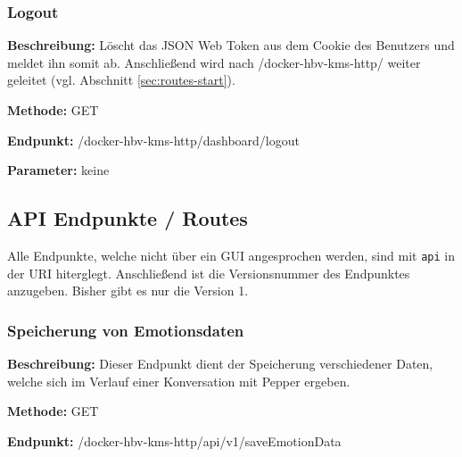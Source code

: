 \subsubsection{Logout}
\label{sec:routes-logout}
\textbf{Beschreibung:} Löscht das JSON Web Token aus dem Cookie des Benutzers und meldet ihn somit ab. Anschließend wird nach /docker-hbv-kms-http/ weiter geleitet (vgl. Abschnitt \ref{sec:routes-start}).

\textbf{Methode:} GET

\textbf{Endpunkt:} /docker-hbv-kms-http/dashboard/logout

\textbf{Parameter:} keine

\dotfill






\subsection{API Endpunkte / Routes}
\label{sec:api-routes}
Alle Endpunkte, welche nicht über ein GUI angesprochen werden, sind mit \verb|api| in der URI hiterglegt. Anschließend ist die Versionsnummer des Endpunktes anzugeben. Bisher gibt es nur die Version 1.

\subsubsection{Speicherung von Emotionsdaten}
\label{sec:api-saveEmotionData}
\textbf{Beschreibung:} Dieser Endpunkt dient der Speicherung verschiedener Daten, welche sich im Verlauf einer Konversation mit Pepper ergeben.

\textbf{Methode:} GET

\textbf{Endpunkt:} /docker-hbv-kms-http/api/v1/saveEmotionData

